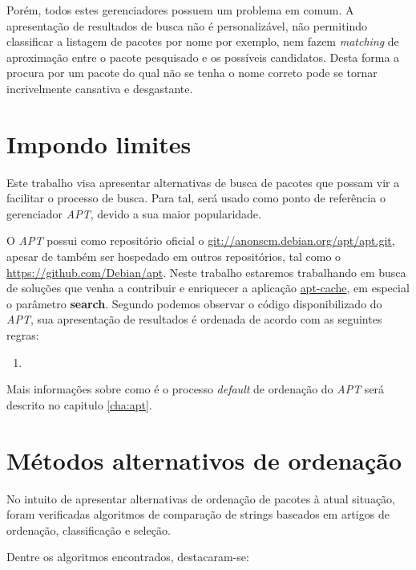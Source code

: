 Porém, todos estes gerenciadores possuem um problema em comum. A apresentação de resultados de busca não é personalizável, não permitindo classificar a listagem de pacotes por nome por exemplo, nem fazem \textit{matching} de aproximação  entre o pacote pesquisado e os possíveis candidatos. Desta forma a procura por um pacote do qual não se tenha o nome correto pode se tornar incrivelmente cansativa e desgastante.

\section{Impondo limites} %
\label{sub:impondo_limites}


Este trabalho visa apresentar alternativas de busca de pacotes que possam vir a facilitar  o processo de busca. Para tal, será usado como ponto de referência o gerenciador \textit{APT}, devido a sua maior popularidade.

O \textit{APT} possui como repositório oficial o \url{git://anonscm.debian.org/apt/apt.git}, apesar de também ser hospedado em outros repositórios, tal como o \url{https://github.com/Debian/apt}. Neste trabalho estaremos trabalhando em busca de soluções que venha a contribuir e enriquecer a aplicação \href{https://github.com/Debian/apt/blob/debian/experimental/cmdline/apt-cache.cc}{apt-cache}, em especial o parâmetro \textbf{search}. Segundo podemos observar o código disponibilizado do \textit{APT}, sua apresentação de resultados é ordenada de acordo com as seguintes regras:

\begin{enumerate}
	\item 
\end{enumerate}

Mais informações sobre como é o processo \textit{default} de ordenação do \textit{APT} será descrito no capitulo \ref{cha:apt}.


\section{Métodos alternativos de ordenação} %
\label{sec:m_todos_alternativos_de_ordena_o}

No intuito de apresentar alternativas de ordenação de pacotes à atual situação, foram verificadas algoritmos de comparação de strings baseados em artigos de ordenação, classificação e seleção.

Dentre os algoritmos encontrados, destacaram-se:

